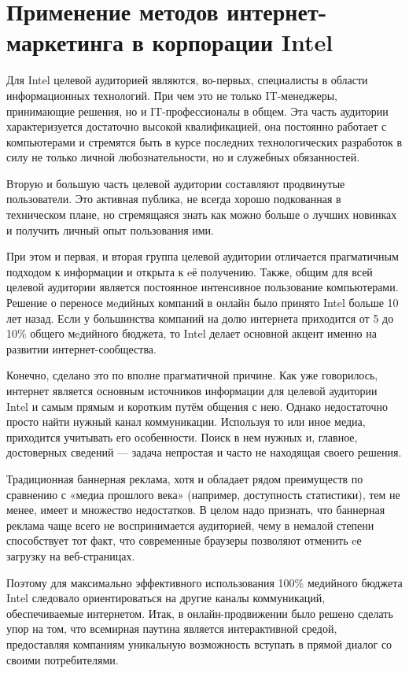 \documentclass[a4paper,english,russian]{G2-105}
\begin{document}
\section{Применение методов интернет-маркетинга в корпорации Intel}
\par Для Intel целевой аудиторией являются, во-первых, специалисты в области информационных технологий. При чем это не только IT-менеджеры, принимающие решения, но и IT-профессионалы в общем. Эта часть аудитории характеризуется достаточно высокой квалификацией, она постоянно работает с компьютерами и стремятся быть в курсе последних технологических разработок в силу не только личной любознательности, но и служебных обязанностей.
\par Вторую и большую часть целевой аудитории составляют продвинутые пользователи. Это активная публика, не всегда хорошо подкованная в техническом плане, но стремящаяся знать как можно больше о лучших новинках и получить личный опыт пользования ими.
\par При этом и первая, и вторая группа целевой аудитории отличается прагматичным подходом к информации и открыта к eё получению. Также, общим для всей целевой аудитории является постоянное интенсивное пользование компьютерами. Решение о переносе мeдийных компаний в онлайн было принято Intel больше 10 лет назад. Если у большинства компаний на долю интернета приходится от 5 до 10\% общего мeдийного бюджета, то Intel делает основной акцент именно на развитии интернет-сообщества.
\par Конечно, сделано это по вполне прагматичной причине. Как уже говорилось, интернет является основным источников информации для целевой аудитории Intel и самым прямым и коротким путём общения с нею.
Однако недостаточно просто найти нужный канал коммуникации. Используя то или иное медиа, приходится учитывать его особенности. Поиск в нем нужных и, главное, достоверных сведений --- задача непростая и часто не находящая своего решения.
\par Традиционная баннерная реклама, хотя и обладает рядом преимуществ по сравнению с «медиа прошлого века» (например, доступность статистики), тем не менее, имеет и множество недостатков. В целом надо признать, что баннерная реклама чаще всего не воспринимается аудиторией, чему в немалой степени способствует тот факт, что современные браузеры позволяют отменить eе загрузку на веб-страницах.
\par Поэтому для максимально эффективного использования 100\% медийного бюджета Intel следовало ориентироваться на другие каналы коммуникаций, обеспечиваемые интернетом. Итак, в онлайн-продвижении было решено сделать упор на том, что всемирная паутина является интерактивной средой, предоставляя компаниям уникальную возможность вступать в прямой диалог со своими потребителями.
\end{document}
